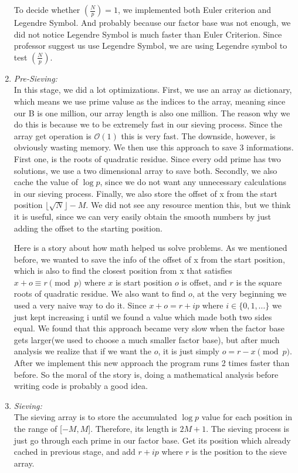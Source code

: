 \documentclass[12pt]{article} %
\newcommand{\itemgap}[1][2]{\vspace{#1mm}}
\newcommand{\legendre}[2]{\left(\frac{#1}{#2}\right)}
\begin{document}
\begin{enumerate}
		To decide whether $\legendre{N}{p} = 1$, we implemented both Euler criterion and Legendre Symbol. And probably because our factor base was not enough, we did not notice Legendre Symbol is much faster than Euler Criterion. Since professor suggest us use Legendre Symbol, we are using Legendre symbol to test $\legendre{N}{p}$.
		
		\item \textit{Pre-Sieving:} \itemgap
		\\ In this stage, we did a lot optimizations. First, we use an array as dictionary, which means we use prime valuse as the indices to the array, meaning since our B is one million, our array length is also one million. The reason why we do this is because we to be extremely fast in our sieving process. Since the array get operation is $\mathcal{O}(1)$ this is very fast. The downside, however, is obviously wasting memory. We then use this approach to save 3 informations. First one, is the roots of quadratic residue. Since every odd prime has two solutions, we use a two dimensional array to save both. Secondly, we also cache the value of $\log p$, since we do not want any unnecessary calculations in our sieving process. Finally, we also store the offset of x from the start position $\lfloor \sqrt{N} \rfloor - M$. We did not see any resource mention this, but we think it is useful, since we can very easily obtain the smooth numbers by just adding the offset to the starting position. 
		
		Here is a story about how math helped us solve problems. As we mentioned before, we wanted to save the info of the offset of x from the start position, which is also to find the closest position from x that satisfies $x+o \equiv r \pmod{p}$ where $x$ is start position $o$ is offset, and $r$ is the square roots of quadratic residue. We also want to find $o$, at the very beginning we used a very naive way to do it. Since $x+o=r+ip$ where $i \in \{0,1,\dots\}$ we just kept increasing i until we found a value which made both two sides equal. We found that this approach became very slow when the factor base gets larger(we used to choose a much smaller factor base), but after much analysis we realize that if we want the $o$, it is just simply $o = r-x \pmod{p}$. After we implement this new approach the program runs 2 times faster than before. So the moral of the story is, doing a mathematical analysis before writing code is probably a good idea.
		
		\item \textit{Sieving:} \itemgap
		\\ The sieving array is to store the accumulated $\log{p}$ value for each position in the range of [$-M, M$]. Therefore, its length is $2M+1$. The sieving process is just go through each prime in our factor base. Get its position which already cached in previous stage, and add $r+ip$ where $r$ is the position to the sieve array.
		

\end{enumerate}
\end{document}

